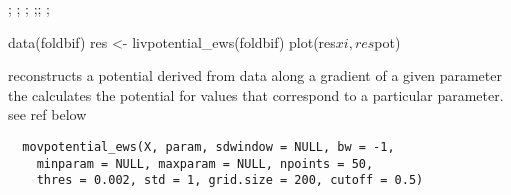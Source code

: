 \documentclass[a4paper]{book}
\begin{document}
%
\begin{SeeAlso}\relax
{}; ;
;
;;
;
\end{SeeAlso}
%
\begin{Examples}
\begin{ExampleCode}
data(foldbif)
res <- livpotential_ews(foldbif)
plot(res$xi, res$pot)
\end{ExampleCode}
\end{Examples}
%
\begin{Description}\relax
{} reconstructs a potential derived
from data along a gradient of a given parameter the
 calculates the potential for
values that correspond to a particular parameter. see ref
below
\end{Description}
%
\begin{Usage}
\begin{verbatim}
  movpotential_ews(X, param, sdwindow = NULL, bw = -1,
    minparam = NULL, maxparam = NULL, npoints = 50,
    thres = 0.002, std = 1, grid.size = 200, cutoff = 0.5)
\end{verbatim}
\end{Usage}
%
\end{document}
